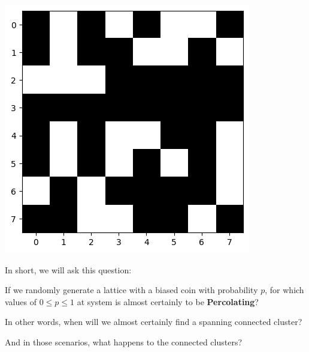 \documentclass[compress]{beamer}
\begin{document}
\begin{frame}
\begin{minipage}{.3\linewidth}
\begin{center}
            \includegraphics[width=\linewidth]{spanning2.png}
        \end{center}
    \end{minipage}

\end{frame}

\begin{frame}

    In short, we will ask this question:

    \vspace{12pt}

    \textcolor{NordOrange}{
        If we randomly generate a lattice with a biased coin with probability \(p\), for
        which values of \(0 \le p \le 1\) at system is almost certainly to be
        \textbf{Percolating}?\\
    }

    \vspace{12pt}

    \textcolor{NordOrange}{
        In other words, when will we almost certainly find a spanning connected cluster?
    }        

    \vspace{12pt}

    And in those scenarios, what happens to the connected clusters? 

\end{frame}
\end{document}
